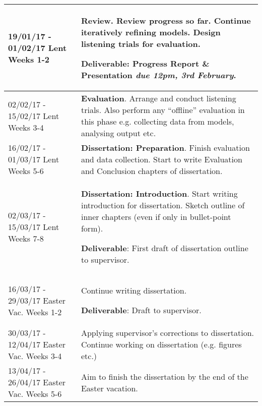 \documentclass[12pt,a4paper,twoside]{article}
\begin{document}
\begin{longtable}{ p{4cm} | p{11cm} }
19/01/17 - 01/02/17 Lent Weeks 1-2 & \textbf{Review}.
Review progress so far. Continue iteratively refining models. Design listening
trials for evaluation.

\textbf{Deliverable}: Progress Report \& Presentation \emph{due 12pm, 3rd
	February}.
\\ \hline

02/02/17 - 15/02/17 Lent Weeks 3-4 & \textbf{Evaluation}.
Arrange and conduct listening trials. Also perform any ``offline'' evaluation in
this phase e.g. collecting data from models, analysing output etc.
\\ \hline

16/02/17 - 01/03/17 Lent Weeks 5-6 & \textbf{Dissertation: Preparation}.
Finish evaluation and data collection. Start to write Evaluation and Conclusion
chapters of dissertation.
\\ \hline

02/03/17 - 15/03/17 Lent Weeks 7-8 & \textbf{Dissertation: Introduction}.
Start writing introduction for dissertation. Sketch outline of inner chapters
(even if only in bullet-point form).

\textbf{Deliverable}: First draft of dissertation outline to supervisor.
\\ \hline

16/03/17 - 29/03/17 Easter Vac. Weeks 1-2 & Continue writing dissertation. 

\textbf{Deliverable}: Draft to supervisor.
\\ \hline

30/03/17 - 12/04/17 Easter Vac. Weeks 3-4 & 
Applying supervisor's corrections to dissertation. Continue working on
dissertation (e.g. figures etc.)
\\ \hline

13/04/17 - 26/04/17 Easter Vac. Weeks 5-6 & 
Aim to finish the dissertation by the end of the Easter vacation.
\\ \hline
\end{longtable}

\printbibliography
\end{document}
